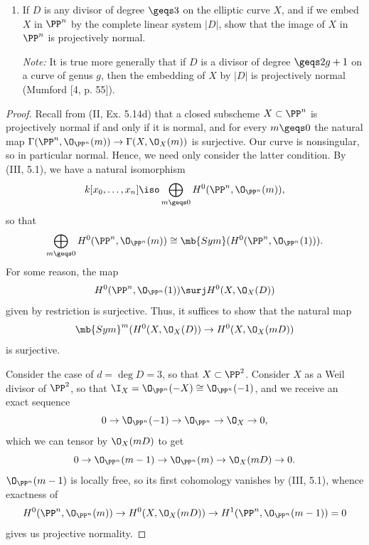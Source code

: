 \documentclass[12pt]{amsart}
\renewcommand{\epsilon}{\varepsilon}
\begin{document}
\begin{enumerate}
	\item[2.] {
      If $D$ is any divisor of degree $\geqs 3$ on the elliptic curve $X$, and if we embed $X$ in $\PP^n$ by the complete linear system $|D|$, show that the image of $X$ in $\PP^n$ is projectively normal.

      \emph{Note:} It is true more generally that if $D$ is a divisor of degree $\geqs 2g+1$ on a curve of genus $g$, then the embedding of $X$ by $|D|$ is projectively normal (Mumford [4, p. 55]).
    }
\end{enumerate}

\begin{proof}
  Recall from (II, Ex. 5.14d) that a closed subscheme $X\subset \PP^n$ is projectively normal if and only if it is normal, and for every $m\geqs 0$ the natural map $\Gamma(\PP^n,\O_{\PP^n}(m))\to\Gamma(X,\O_X(m))$ is surjective.
  Our curve is nonsingular, so in particular normal. 
  Hence, we need only consider the latter condition.
  By (III, 5.1), we have a natural isomorphism
  \[
    k[x_0,\ldots,x_n]\iso \bigoplus_{m\geqs 0}H^0(\PP^n,\O_{\PP^n}(m)),
  \] 
  so that
  \[
    \bigoplus_{m\geqs 0}H^0(\PP^n,\O_{\PP^n}(m))\cong \mb{Sym}(H^0(\PP^n,\O_{\PP^n}(1))).
  \] 
  For some reason, the map
  \begin{align*}
    H^0(\PP^n,\O_{\PP^n}(1))\surj H^0(X,\O_X(D))
  \end{align*}
  given by restriction is surjective.
  Thus, it suffices to show that the natural map
  \[
    \mb{Sym}^m(H^0(X,\O_X(D))\to H^0(X,\O_X(mD))
  \] 
  is surjective.

  Consider the case of $d=\deg D=3$, so that $X\subset \PP^2$.
  Consider $X$ as a Weil divisor of $\PP^2$, so that $\I_X=\O_{\PP^n}(-X)\cong \O_{\PP^n}(-1)$, and we receive an exact sequence
  \[
    0\to \O_{\PP^n}(-1)\to \O_{\PP^n}\to \O_X\to 0,
  \] 
  which we can tensor by $\O_X(mD)$ to get
  \[
    0\to \O_{\PP^n}(m-1)\to \O_{\PP^n}(m)\to \O_X(mD)\to 0.
  \] 
  $\O_{\PP^n}(m-1)$ is locally free, so its first cohomology vanishes by (III, 5.1), whence exactness of
  \[
    H^0(\PP^n,\O_{\PP^n}(m))\to H^0(X,\O_X(mD))\to H^1(\PP^n, \O_{\PP^n}(m-1))=0
  \] 
  gives us projective normality.



\end{proof}
\end{document}
